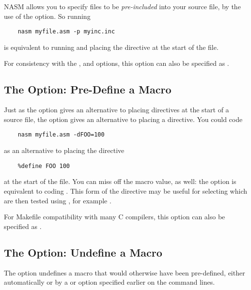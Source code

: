 NASM allows you to specify files to be \emph{pre-included} into
your source file, by the use of the  option. So running

\begin{lstlisting}
	nasm myfile.asm -p myinc.inc
\end{lstlisting}

is equivalent to running  and placing the
directive  at the start of the file.

For consistency with the ,  and  options,
this option can also be specified as .

\subsection{The  Option: Pre-Define a Macro}
\label{subsec:opt-d}

Just as the  option gives an alternative to placing
 directives at the start of a source file, the 
option gives an alternative to placing a  directive. You
could code

\begin{lstlisting}
	nasm myfile.asm -dFOO=100
\end{lstlisting}

as an alternative to placing the directive

\begin{lstlisting}
	%define FOO 100
\end{lstlisting}

at the start of the file. You can miss off the macro value, as well:
the option  is equivalent to coding .
This form of the directive may be useful for selecting  which are then tested using , for example .

For Makefile compatibility with many C compilers, this option can also
be specified as .

\subsection{The  Option: Undefine a Macro}
\label{subsec:opt-u}

The  option undefines a macro that would otherwise
have been pre-defined, either automatically or by a  or 
option specified earlier on the command lines.

